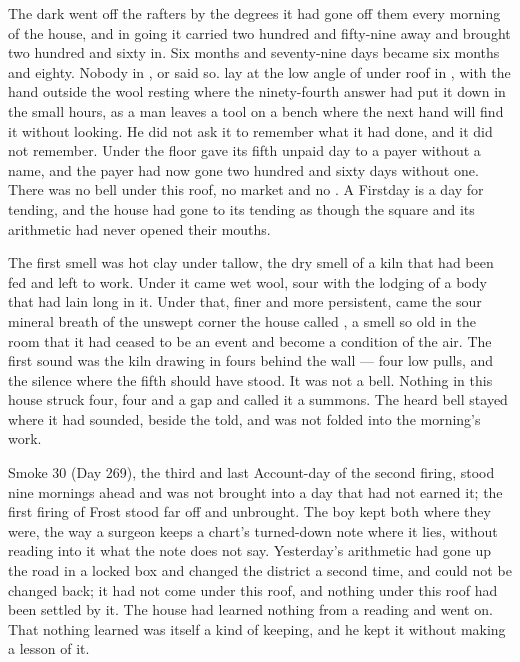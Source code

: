 
The dark went off the rafters by the degrees it had gone off them every morning of the house, and in going it carried two hundred and fifty-nine away and brought two hundred and sixty in. Six months and seventy-nine days became six months and eighty. Nobody in ,  or  said so.  lay at the low angle of  under  roof in , with the hand outside the wool resting where the ninety-fourth answer had put it down in the small hours, as a man leaves a tool on a bench where the next hand will find it without looking. He did not ask it to remember what it had done, and it did not remember. Under the floor  gave its fifth unpaid day to a payer without a name, and the payer had now gone two hundred and sixty days without one. There was no bell under this roof, no market and no . A Firstday is a day for tending, and the house had gone to its tending as though the square and its arithmetic had never opened their mouths.

The first smell was hot clay under tallow, the dry smell of a kiln that had been fed and left to work. Under it came wet wool, sour with the lodging of a body that had lain long in it. Under that, finer and more persistent, came the sour mineral breath of the unswept corner the house called , a smell so old in the room that it had ceased to be an event and become a condition of the air. The first sound was the kiln drawing in fours behind the wall --- four low pulls, and the silence where the fifth should have stood. It was not a bell. Nothing in this house struck four, four and a gap and called it a summons. The heard bell stayed where it had sounded, beside the told, and was not folded into the morning's work.

Smoke 30 (Day 269), the third and last Account-day of the second firing, stood nine mornings ahead and was not brought into a day that had not earned it; the first firing of Frost stood far off and unbrought. The boy kept both where they were, the way a surgeon keeps a chart's turned-down note where it lies, without reading into it what the note does not say. Yesterday's arithmetic had gone up the road in a locked box and changed the district a second time, and could not be changed back; it had not come under this roof, and nothing under this roof had been settled by it. The house had learned nothing from a reading and went on. That nothing learned was itself a kind of keeping, and he kept it without making a lesson of it.

